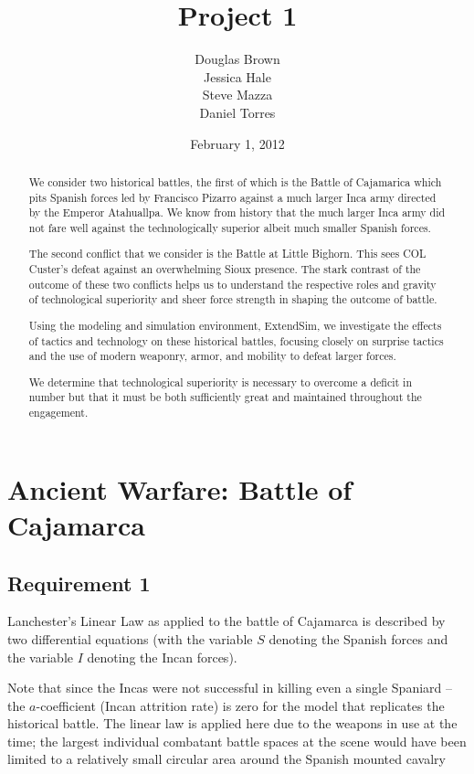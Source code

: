 \documentclass[letterpaper,10pt]{article}
\title{Project 1}
\author{Douglas Brown \\ Jessica Hale \\ Steve Mazza \\ Daniel Torres}
\date{February 1, 2012}
\begin{document}
\maketitle
\tableofcontents
\listoffigures
\listoftables
\pagebreak

\begin{abstract}
We consider two historical battles, the first of which is the Battle of Cajamarica which pits Spanish forces led by Francisco Pizarro against a much larger Inca army directed by the Emperor Atahuallpa.  We know from history that the much larger Inca army did not fare well against the technologically superior albeit much smaller Spanish forces.

The second conflict that we consider is the Battle at Little Bighorn.  This sees COL Custer's defeat against an overwhelming Sioux presence.  The stark contrast of the outcome of these two conflicts helps us to understand the respective roles and gravity of technological superiority and sheer force strength in shaping the outcome of battle.

Using the modeling and simulation environment, ExtendSim, we investigate the effects of tactics and technology on these historical battles, focusing closely on surprise tactics and the use of modern weaponry, armor, and mobility to defeat larger forces.

We determine that technological superiority is necessary to overcome a deficit in number but that it must be both sufficiently great and maintained throughout the engagement.
\end{abstract}

\section{Ancient Warfare: Battle of Cajamarca}

\subsection{Requirement 1}
Lanchester's Linear Law as applied to the battle of Cajamarca is described by two differential equations (with the variable $S$ denoting the Spanish forces and the variable $I$ denoting the Incan forces).

Note that since the Incas were not successful in killing even a single Spaniard -- the $a$-coefficient (Incan attrition rate) is zero for the model that replicates the historical battle.  The linear law is applied here due to the weapons in use at the time; the largest individual combatant battle spaces at the scene would have been limited to a relatively small circular area around the Spanish mounted cavalry
\end{document}
